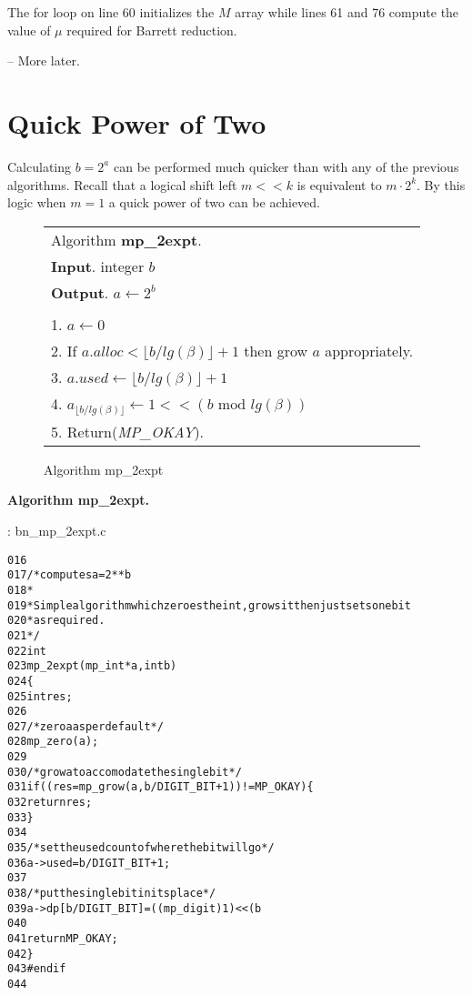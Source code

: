 \documentclass[b5paper]{book}
\begin{document}
The for loop on line 60 initializes the $M$ array while lines 61 and 76 compute the value of $\mu$ required for
Barrett reduction.  

-- More later.

\section{Quick Power of Two}
Calculating $b = 2^a$ can be performed much quicker than with any of the previous algorithms.  Recall that a logical shift left $m << k$ is
equivalent to $m \cdot 2^k$.  By this logic when $m = 1$ a quick power of two can be achieved.

\begin{figure}[!here]
\begin{small}
\begin{center}
\begin{tabular}{l}
\hline Algorithm \textbf{mp\_2expt}. \\
\textbf{Input}.   integer $b$ \\
\textbf{Output}.  $a \leftarrow 2^b$ \\
\hline \\
1.  $a \leftarrow 0$ \\
2.  If $a.alloc < \lfloor b / lg(\beta) \rfloor + 1$ then grow $a$ appropriately. \\
3.  $a.used \leftarrow \lfloor b / lg(\beta) \rfloor + 1$ \\
4.  $a_{\lfloor b / lg(\beta) \rfloor} \leftarrow 1 << (b \mbox{ mod } lg(\beta))$ \\
5.  Return(\textit{MP\_OKAY}). \\
\hline
\end{tabular}
\end{center}
\end{small}
\caption{Algorithm mp\_2expt}
\end{figure}

\textbf{Algorithm mp\_2expt.}

\vspace{+3mm}\begin{small}
\hspace{-5.1mm}{\bf File}: bn\_mp\_2expt.c
\vspace{-3mm}
\begin{alltt}
016   
017   /* computes a = 2**b 
018    *
019    * Simple algorithm which zeroes the int, grows it then just sets one bit
020    * as required.
021    */
022   int
023   mp_2expt (mp_int * a, int b)
024   \{
025     int     res;
026   
027     /* zero a as per default */
028     mp_zero (a);
029   
030     /* grow a to accomodate the single bit */
031     if ((res = mp_grow (a, b / DIGIT_BIT + 1)) != MP_OKAY) \{
032       return res;
033     \}
034   
035     /* set the used count of where the bit will go */
036     a->used = b / DIGIT_BIT + 1;
037   
038     /* put the single bit in its place */
039     a->dp[b / DIGIT_BIT] = ((mp_digit)1) << (b % DIGIT_BIT);
040   
041     return MP_OKAY;
042   \}
043   #endif
044   
\end{alltt}
\end{small}
\end{document}
